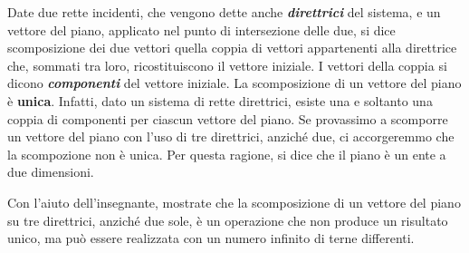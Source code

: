 Date due rette incidenti, che vengono dette anche {\bfseries \slshape {direttrici}} del sistema, e un vettore del piano, applicato nel punto di intersezione delle due, si dice scomposizione dei due vettori quella coppia di vettori appartenenti alla direttrice che, sommati tra loro, ricostituiscono il vettore iniziale. I vettori della coppia si dicono {\bfseries \slshape{componenti}} del vettore iniziale.\newline
La scomposizione di un vettore del piano è {\bfseries unica}. Infatti, dato un sistema di rette direttrici, esiste una e soltanto una coppia di componenti per ciascun vettore del piano. Se provassimo a scomporre un vettore del piano con l'uso di tre direttrici, anziché due, ci accorgeremmo che la scompozione non è unica. Per questa ragione, si dice che il piano è un ente a due dimensioni.
\newline

Con l'aiuto dell'insegnante, mostrate che la scomposizione di un vettore del piano su tre direttrici, anziché due sole, è un operazione che non produce un risultato unico, ma può essere realizzata con un numero infinito di terne differenti.

